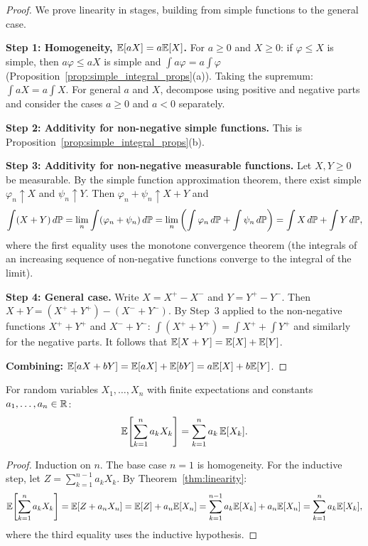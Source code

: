 \documentclass[11pt,a4paper]{article}
\begin{document}
\begin{proof}
We prove linearity in stages, building from simple functions to the general
case.

\textbf{Step 1: Homogeneity, $\mathbb{E}[aX] = a\mathbb{E}[X]$.}
For $a \geq 0$ and $X \geq 0$: if $\varphi \leq X$ is simple, then
$a\varphi \leq aX$ is simple and $\int a\varphi = a \int \varphi$
(Proposition~\ref{prop:simple_integral_props}(a)). Taking the supremum:
$\int aX = a \int X$. For general $a$ and $X$, decompose using positive
and negative parts and consider the cases $a \geq 0$ and $a < 0$
separately.

\textbf{Step 2: Additivity for non-negative simple functions.}
This is Proposition~\ref{prop:simple_integral_props}(b).

\textbf{Step 3: Additivity for non-negative measurable functions.}
Let $X, Y \geq 0$ be measurable. By the simple function approximation
theorem, there exist simple $\varphi_n \uparrow X$ and
$\psi_n \uparrow Y$. Then $\varphi_n + \psi_n \uparrow X + Y$ and
\[
  \int (X + Y)\, d\mathbb{P}
  = \lim_n \int (\varphi_n + \psi_n)\, d\mathbb{P}
  = \lim_n \left(\int \varphi_n\, d\mathbb{P} + \int \psi_n\, d\mathbb{P}\right)
  = \int X\, d\mathbb{P} + \int Y\, d\mathbb{P},
\]
where the first equality uses the monotone convergence theorem (the
integrals of an increasing sequence of non-negative functions converge to
the integral of the limit).

\textbf{Step 4: General case.}
Write $X = X^+ - X^-$ and $Y = Y^+ - Y^-$. Then
$X + Y = (X^+ + Y^+) - (X^- + Y^-)$. By Step~3 applied to the
non-negative functions $X^+ + Y^+$ and $X^- + Y^-$:
$\int(X^+ + Y^+) = \int X^+ + \int Y^+$ and similarly for the negative
parts. It follows that $\mathbb{E}[X+Y] = \mathbb{E}[X] + \mathbb{E}[Y]$.

\textbf{Combining:} $\mathbb{E}[aX + bY] = \mathbb{E}[aX] + \mathbb{E}[bY] = a\mathbb{E}[X] + b\mathbb{E}[Y]$.
\end{proof}

\begin{corollary}
\label{cor:linearity_sum}
For random variables $X_1, \ldots, X_n$ with finite expectations and
constants $a_1, \ldots, a_n \in \mathbb{R}$:
\begin{equation}
  \mathbb{E}\!\left[\sum_{k=1}^n a_k X_k\right]
  = \sum_{k=1}^n a_k\, \mathbb{E}[X_k].
  \label{eq:linearity_sum}
\end{equation}
\end{corollary}

\begin{proof}
Induction on $n$. The base case $n = 1$ is homogeneity. For the inductive
step, let $Z = \sum_{k=1}^{n-1} a_k X_k$. By
Theorem~\ref{thm:linearity}:
\[
  \mathbb{E}\!\left[\sum_{k=1}^n a_k X_k\right]
  = \mathbb{E}[Z + a_n X_n]
  = \mathbb{E}[Z] + a_n \mathbb{E}[X_n]
  = \sum_{k=1}^{n-1} a_k \mathbb{E}[X_k] + a_n \mathbb{E}[X_n]
  = \sum_{k=1}^n a_k \mathbb{E}[X_k],
\]
where the third equality uses the inductive hypothesis.
\end{proof}
\end{document}
